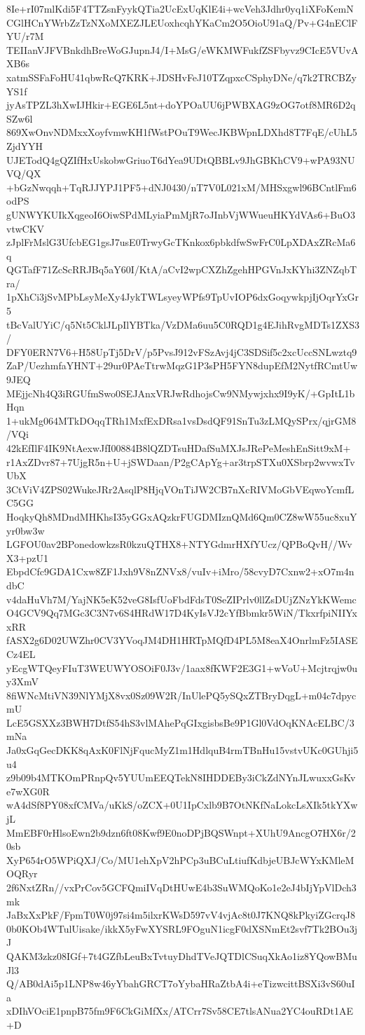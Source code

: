 8Ie+rI07mlKdi5F4TTZsnFyykQTia2UcExUqKlE4i+wcVeh3Jdhr0yq1iXFoKemN
CGlHCnYWrbZzTzNXoMXEZJLEUoxhcqhYKaCm2O5OioU91aQ/Pv+G4nEClFYU/r7M
TEIIanVJFVBnkdhBreWoGJupnJ4/I+MsG/eWKMWFukfZSFbyvz9CIcE5VUvAXB6s
xatmSSFaFoHU41qbwRcQ7KRK+JDSHvFeJ10TZqpxcCSphyDNe/q7k2TRCBZyYS1f
jyAsTPZL3hXwIJHkir+EGE6L5nt+doYPOaUU6jPWBXAG9zOG7otf8MR6D2qSZw6l
869XwOnvNDMxxXoyfvmwKH1fWstPOuT9WecJKBWpnLDXhd8T7FqE/cUhL5ZjdYYH
UJETodQ4gQZIfHxUskobwGriuoT6dYea9UDtQBBLv9JhGBKhCV9+wPA93NUVQ/QX
+bGzNwqqh+TqRJJYPJ1PF5+dNJ0430/nT7V0L021xM/MHSxgwl96BCntlFm6odPS
gUNWYKUIkXqgeoI6OiwSPdMLyiaPmMjR7oJInbVjWWueuHKYdVAs6+BuO3vtwCKV
zJplFrMslG3UfcbEG1gsJ7usE0TrwyGcTKnkox6pbkdfwSwFrC0LpXDAxZRcMa6q
QGTafF71ZcScRRJBq5aY60I/KtA/aCvI2wpCXZhZgehHPGVnJxKYhi3ZNZqbTra/
1pXhCi3jSvMPbLsyMeXy4JykTWLsyeyWPfs9TpUvIOP6dxGoqywkpjIjOqrYxGr5
tBcValUYiC/q5Nt5CklJLpIlYBTka/VzDMa6uu5C0RQD1g4EJihRvgMDTs1ZXS3/
DFY0ERN7V6+H58UpTj5DrV/p5PvsJ912vFSzAvj4jC3SDSif5c2xcUccSNLwztq9
ZaP/UezhmfaYHNT+29ur0PAeTtrwMqzG1P3sPH5FYN8dupEfM2NytfRCmtUw9JEQ
MEjjcNh4Q3iRGUfmSwo0SEJAnxVRJwRdhojsCw9NMywjxhx9I9yK/+GpItL1bHqn
1+ukMg064MTkDOqqTRh1MxfExDRsa1vsDsdQF91SnTu3zLMQySPrx/qjrGM8/VQi
42kEfIlF4IK9NtAexwJfI00884B8lQZDTsuHDafSuMXJsJRePeMeshEnSitt9xM+
r1AxZDvr87+7UjgR5n+U+jSWDaan/P2gCApYg+ar3trpSTXu0XSbrp2wvwxTvUbX
3CtViV4ZPS02WukeJRr2AsqlP8HjqVOnTiJW2CB7nXcRIVMoGbVEqwoYcmfLC5GG
HoqkyQh8MDndMHKhsI35yGGxAQzkrFUGDMIznQMd6Qm0CZ8wW55uc8xuYyr0bw3w
LGFOU0av2BPonedowkzsR0kzuQTHX8+NTYGdmrHXfYUcz/QPBoQvH//WvX3+pzU1
EbpdCfc9GDA1Cxw8ZF1Jxh9V8nZNVx8/vuIv+iMro/58cvyD7Cxnw2+xO7m4ndbC
v4daHuVh7M/YajNK5eK52veG8IsfUoFbdFdsT0SeZIPrlv0llZsDUjZNzYkKWemc
O4GCV9Qq7MGc3C3N7v6S4HRdW17D4KyIsVJ2cYfBbmkr5WiN/TkxrfpiNIIYxxRR
fASX2g6D02UWZhr0CV3YVoqJM4DH1HRTpMQfD4PL5M8eaX4OnrlmFz5IASECz4EL
yEcgWTQeyFIuT3WEUWYOSOiF0J3v/1aax8fKWF2E3G1+wVoU+Mcjtrqjw0uy3XmV
8fiWNcMtiVN39NlYMjX8vx0Sz09W2R/InUlePQ5ySQxZTBryDqgL+m04c7dpycmU
LcE5GSXXz3BWH7DtfS54hS3vlMAhePqGIxgisbsBe9P1Gl0VdOqKNAcELBC/3mNa
Ja0xGqGecDKK8qAxK0FlNjFqucMyZ1m1HdlquB4rmTBnHu15vstvUKc0GUhji5u4
z9b09b4MTKOmPRnpQv5YUUmEEQTekN8IHDDEBy3iCkZdNYnJLwuxxGsKve7wXG0R
wA4dSf8PY08xfCMVa/uKkS/oZCX+0U1IpCxlb9B7OtNKfNaLokcLsXIk5tkYXwjL
MmEBF0rHlsoEwn2b9dzn6ft08Kwf9E0noDPjBQSWnpt+XUhU9AncgO7HX6r/20sb
XyP654rO5WPiQXJ/Co/MU1ehXpV2hPCp3uBCuLtiufKdbjeUBJcWYxKMleMOQRyr
2f6NxtZRn//vxPrCov5GCFQmiIVqDtHUwE4b3SuWMQoKo1e2eJ4bIjYpVlDch3mk
JaBxXxPkF/FpmT0W0j97si4m5ilxrKWsD597vV4vjAc8t0J7KNQ8kPkyiZGcrqJ8
0b0KOb4WTulUisake/ikkX5yFwXYSRL9FOguN1icgF0dXSNmEt2svf7Tk2BOu3jJ
QAKM3zkz08IGf+7t4GZfbLeuBxTvtuyDhdTVeJQTDlCSuqXkAo1iz8YQowBMuJl3
Q/AB0dAi5p1LNP8w46yYbahGRCT7oYybaHRaZtbA4i+eTizwcittBSXi3vS60uIa
xDIhVOciE1pnpB75fm9F6CkGiMfXx/ATCrr7Sv58CE7tlsANua2YC4ouRDt1AE+D
